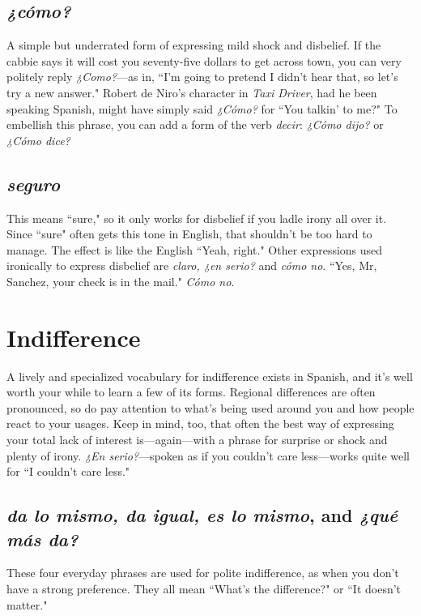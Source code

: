 \subsection{\emph{¿cómo?}}

A simple but underrated form of expressing mild shock and
disbelief. If the cabbie says it will cost you seventy-five dollars to get
across town, you can very politely reply \emph{¿Como?}---as in, ``I'm going to
pretend I didn't hear that, so let's try a new answer." Robert de Niro's
character in \emph{Taxi Driver}, had he been speaking Spanish, might have
simply said \emph{¿Cómo?} for ``You talkin' to me?" To embellish this phrase,
you can add a form of the verb \emph{decir}: \emph{¿Cómo dijo?} or \emph{¿Cómo dice?}

\subsection{\emph{seguro}}

This means ``sure," so it only works for disbelief if you ladle
irony all over it. Since ``sure" often gets this tone in English, that
shouldn't be too hard to manage. The effect is like the English ``Yeah,
right." Other expressions used ironically to express disbelief are \emph{claro,
	¿en serio?} and \emph{cómo no}. ``Yes, Mr, Sanchez, your check is in the mail."
\emph{Cómo no}.

\section{Indifference}

A lively and specialized vocabulary for indifference exists in
Spanish, and it's well worth your while to learn a few of its forms. Regional differences are often pronounced, so do pay attention to what's
being used around you and how people react to your usages. Keep in
mind, too, that often the best way of expressing your total lack of interest is---again---with a phrase for surprise or shock and plenty of
irony. \emph{¿En serio?}---spoken as if you couldn't care less---works quite
well for ``I couldn't care less."

\subsection{\emph{da lo mismo, da igual, es lo mismo}, and \emph{¿qué más da?}}

These four everyday phrases are used for polite indifference, as
when you don't have a strong preference. They all mean ``What's the
difference?" or ``It doesn't matter."

